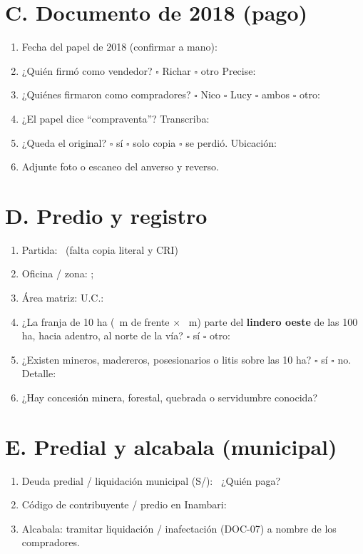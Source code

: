 \documentclass[12pt,a4paper]{article}
\begin{document}
\section*{C. Documento de 2018 (pago)}
\begin{enumerate}[leftmargin=1.15cm]
\item Fecha del papel de 2018 (confirmar a mano): \FechaPago
\item ¿Quién firmó como vendedor? \quad $\square$ Richar \quad $\square$ otro \quad Precise: \linea[11.2cm]
\item ¿Quiénes firmaron como compradores? \quad $\square$ Nico \quad $\square$ Lucy \quad $\square$ ambos \quad $\square$ otro: \linea[11.2cm]
\item ¿El papel dice ``compraventa''? Transcriba: \linea[8.5cm]
\item ¿Queda el original? \quad $\square$ sí \quad $\square$ solo copia \quad $\square$ se perdió. Ubicación: \linea[4.4cm]
\item Adjunte foto o escaneo del anverso y reverso.
\end{enumerate}

\section*{D. Predio y registro}
\begin{enumerate}[leftmargin=1.15cm]
\item Partida: \textbf{\PartidaMatriz}\ (falta copia literal y CRI)
\item Oficina / zona: \textbf{\OficinaRegistral}; \textbf{\ZonaRegistral}
\item Área matriz: \textbf{\AreaMatriz} \quad U.C.: \textbf{\UnidadCatastral}
\item ¿La franja de 10 ha (\FrenteM\ m de frente $\times$ \FondoM\ m) parte del \textbf{lindero oeste} de las 100 ha, hacia adentro, al norte de la vía? \quad $\square$ sí \quad $\square$ otro: \linea[3.2cm]
\item ¿Existen mineros, madereros, posesionarios o litis sobre las 10 ha? \quad $\square$ sí \quad $\square$ no. Detalle: \linea[5.5cm]
\item ¿Hay concesión minera, forestal, quebrada o servidumbre conocida? \linea[7.2cm]
\end{enumerate}

\section*{E. Predial y alcabala (municipal)}
\begin{enumerate}[leftmargin=1.15cm]
\item Deuda predial / liquidación municipal (S/): \DeudaPredialReferencia\ ¿Quién paga? \linea[5cm]
\item Código de contribuyente / predio en Inambari: \linea[8cm]
\item Alcabala: tramitar liquidación / inafectación (DOC-07) a nombre de los compradores.
\end{enumerate}
\end{document}
